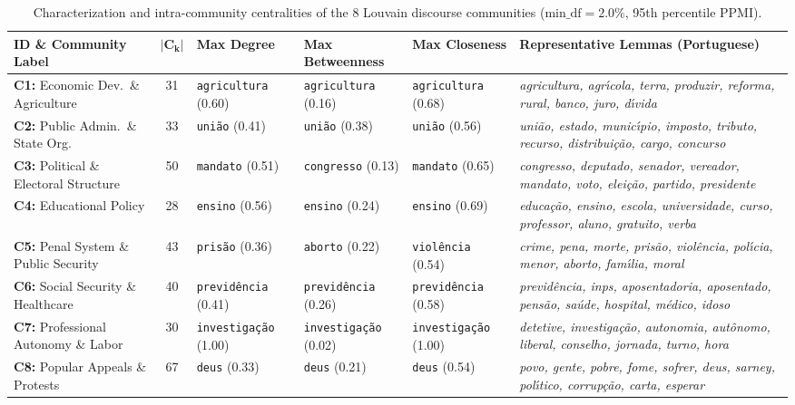 \documentclass[pdflatex,sn-basic]{sn-jnl}
\begin{document}
\begin{table}[t]
\caption{Characterization and intra-community centralities of the 8 Louvain discourse communities ($\text{min\_df}=2.0\%$, 95th percentile PPMI).}\label{tab:communities}
\footnotesize
\setlength{\tabcolsep}{5pt}
\renewcommand{\arraystretch}{1.25}
\begin{tabularx}{\textwidth}{@{}>{\raggedright\arraybackslash}p{3.6cm} c >{\raggedright\arraybackslash}p{2.3cm} >{\raggedright\arraybackslash}p{2.3cm} >{\raggedright\arraybackslash}p{2.3cm} X@{}}
\toprule
\textbf{ID \& Community Label} & $\boldsymbol{|C_k|}$ & \textbf{Max Degree} & \textbf{Max Betweenness} & \textbf{Max Closeness} & \textbf{Representative Lemmas (Portuguese)} \\
\midrule
\textbf{C1:} Economic Dev.\ \& Agriculture & 31 & \texttt{agricultura} (0.60) & \texttt{agricultura} (0.16) & \texttt{agricultura} (0.68) & \textit{agricultura, agr\'{\i}cola, terra, produzir, reforma, rural, banco, juro, d\'{\i}vida} \\
\textbf{C2:} Public Admin.\ \& State Org. & 33 & \texttt{uni\~{a}o} (0.41) & \texttt{uni\~{a}o} (0.38) & \texttt{uni\~{a}o} (0.56) & \textit{uni\~{a}o, estado, munic\'{\i}pio, imposto, tributo, recurso, distribui\c{c}\~{a}o, cargo, concurso} \\
\textbf{C3:} Political \& Electoral Structure & 50 & \texttt{mandato} (0.51) & \texttt{congresso} (0.13) & \texttt{mandato} (0.65) & \textit{congresso, deputado, senador, vereador, mandato, voto, elei\c{c}\~{a}o, partido, presidente} \\
\textbf{C4:} Educational Policy & 28 & \texttt{ensino} (0.56) & \texttt{ensino} (0.24) & \texttt{ensino} (0.69) & \textit{educa\c{c}\~{a}o, ensino, escola, universidade, curso, professor, aluno, gratuito, verba} \\
\textbf{C5:} Penal System \& Public Security & 43 & \texttt{pris\~{a}o} (0.36) & \texttt{aborto} (0.22) & \texttt{viol\^{e}ncia} (0.54) & \textit{crime, pena, morte, pris\~{a}o, viol\^{e}ncia, pol\'{\i}cia, menor, aborto, fam\'{\i}lia, moral} \\
\textbf{C6:} Social Security \& Healthcare & 40 & \texttt{previd\^{e}ncia} (0.41) & \texttt{previd\^{e}ncia} (0.26) & \texttt{previd\^{e}ncia} (0.58) & \textit{previd\^{e}ncia, inps, aposentadoria, aposentado, pens\~{a}o, sa\'{u}de, hospital, m\'{e}dico, idoso} \\
\textbf{C7:} Professional Autonomy \& Labor & 30 & \texttt{investiga\c{c}\~{a}o} (1.00) & \texttt{investiga\c{c}\~{a}o} (0.02) & \texttt{investiga\c{c}\~{a}o} (1.00) & \textit{detetive, investiga\c{c}\~{a}o, autonomia, aut\^{o}nomo, liberal, conselho, jornada, turno, hora} \\
\textbf{C8:} Popular Appeals \& Protests & 67 & \texttt{deus} (0.33) & \texttt{deus} (0.21) & \texttt{deus} (0.54) & \textit{povo, gente, pobre, fome, sofrer, deus, sarney, pol\'{\i}tico, corrup\c{c}\~{a}o, carta, esperar} \\
\bottomrule
\end{tabularx}
\end{table}
\end{document}
